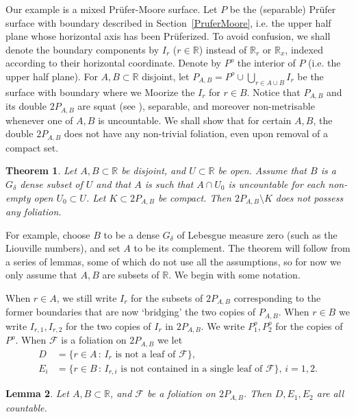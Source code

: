 \documentclass{amsart}
\newtheorem{theorem}{Theorem}[section]
\newtheorem{lemma}[theorem]{Lemma}
\begin{document}
Our example is a mixed Pr\"ufer-Moore surface. Let $P$ be the (separable) Pr\"ufer surface with boundary described in Section~\ref{PruferMoore}, i.e. the upper half plane whose horizontal axis has been Pr\"uferized. To avoid confusion, we shall denote the boundary components by $I_r$ ($r\in{\mathbb R}$) instead of ${\mathbb R}_r$ or ${\mathbb R}_x$, indexed according to their horizontal coordinate. Denote by $P^o$ the interior of $P$ (i.e. the upper half plane). For $A,B\subset{\mathbb R}$ disjoint, let $P_{A,B}=P^o\cup\bigcup_{r\in A\cup B}I_r$ be the surface with boundary where we Moorize the $I_r$ for $r\in B$. Notice that $P_{A,B}$ and its double $2P_{A,B}$ are squat (see \cite[Example 4.4]{BGG1}), separable, and moreover non-metrisable whenever one of $A,B$ is uncountable. We shall show that for certain $A,B$, the double $2P_{A,B}$ does not have any non-trivial foliation, even upon removal of a compact set.

\begin{theorem}\label{thm31bis}
Let $A,B\subset{\mathbb R}$ be disjoint, and $U\subset {\mathbb R}$ be open. Assume that $B$ is a $G_\delta$ dense subset of $U$ and that $A$ is such that $A\cap U_0$ is uncountable for each non-empty open $U_0\subset U$. Let $K\subset 2P_{A,B}$ be compact. Then $2P_{A,B}\setminus K$ does not possess any foliation.
\end{theorem}

For example, choose $B$ to be a dense $G_\delta$ of Lebesgue measure zero (such as the Liouville numbers), and set $A$ to be its complement. The theorem will follow from a series of lemmas, some of which do not use all the assumptions, so for now we only assume that $A,B$ are subsets of ${\mathbb R}$. We begin with some notation.

When $r\in A$, we still write $I_r$ for the subsets of $2P_{A,B}$ corresponding to the former boundaries that are now `bridging' the two copies of $P_{A,B}$. When $r\in B$ we write $I_{r,1},I_{r,2}$ for the two copies of $I_r$ in $2P_{A,B}$. We write $P^o_1,P^o_2$ for the copies of $P^o$. When $\mathcal{F}$ is a foliation on $2P_{A,B}$ we let
\begin{align*}
  D &=\{r\in A\,:\, I_r\textrm{ is not a leaf of }\mathcal{F}\},\\
  E_i &=\{r\in B\,:\, I_{r,i}\textrm{ is not contained in a single leaf of }\mathcal{F}\},\, i=1,2.
\end{align*}

\begin{lemma}\label{31bis1}
  Let $A,B\subset{\mathbb R}$, and $\mathcal{F}$ be a foliation on $2P_{A,B}$. Then $D,E_1,E_2$ are all countable.
\end{lemma}
\end{document}
